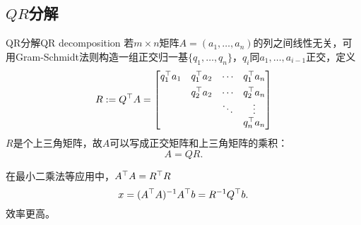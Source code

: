 \subsection{\texorpdfstring{$QR$}{QR}分解}

\begin{theorem}{QR分解}{QR decomposition}
	若$m\times n$矩阵$A=(a_1,\ldots,a_n)$的列之间线性无关，可用Gram-Schmidt法则构造一组正交归一基$\{q_1,\ldots,q_n\}$，$q_i$同$a_1,\ldots,a_{i-1}$正交，定义
	\[
		R:=Q^\top A=\begin{bmatrix}
			q_1^\top a_1&q_1^\top a_2&\cdots&q_1^\top a_n\\[1ex]
			&q_2^\top a_2&\cdots&q_2^\top a_n\\
			&&\ddots&\vdots\\
			&&&q_n^\top a_n
		\end{bmatrix}
	\]
	$R$是个上三角矩阵，故$A$可以写成正交矩阵和上三角矩阵的乘积：
	\begin{equation}
		A=QR.
	\end{equation}
\end{theorem}

\begin{remark}
	在最小二乘法等应用中，$A^\top A=R^\top R$
	\[
		x=(A^\top A)^{-1} A^\top b=R^{-1} Q^\top b.
	\]
	效率更高。
\end{remark}
